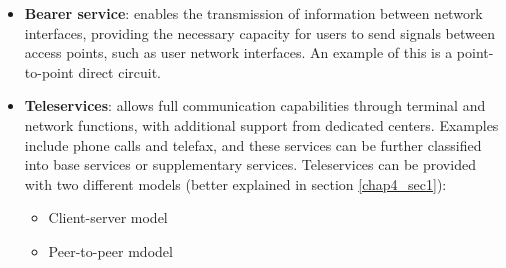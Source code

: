 \begin{itemize}
    \item \textbf{Bearer service}: enables the transmission of information between network interfaces, providing the necessary capacity for users to send signals between access points, such as user network interfaces. An example of this is a point-to-point direct circuit.
    \item \textbf{Teleservices}: allows full communication capabilities through terminal and network functions, with additional support from dedicated centers. Examples include phone calls and telefax, and these services can be further classified into base services or supplementary services. Teleservices can be provided with two different models (better explained in section \ref{chap4_sec1}):
    \begin{itemize}
        \item Client-server model
        \item Peer-to-peer mdodel
    \end{itemize}
\end{itemize}